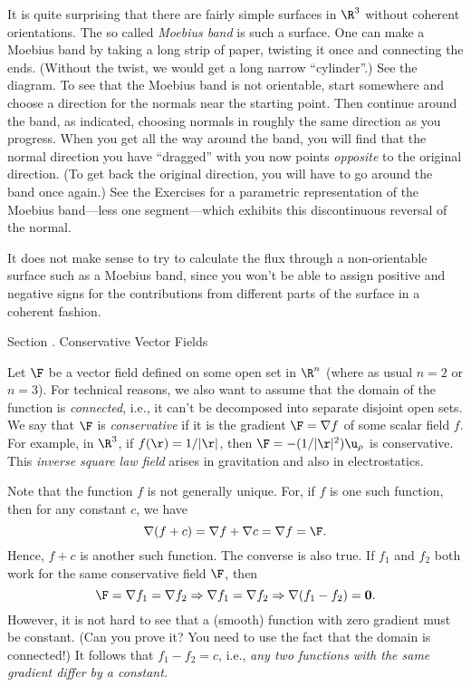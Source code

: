 It is quite surprising that there are fairly simple
surfaces in $\R^3$ without 
coherent orientations.  The so called {\it Moebius
band\/} is such a surface.  One can make a Moebius band
by taking a long strip of paper, twisting it once
and connecting the ends.  (Without the twist, we
would get a long narrow ``cylinder''.)  See the
diagram.  To see that the Moebius band is not
orientable, start somewhere and choose a direction
for the normals near the starting point.  Then continue
around the band, as indicated, choosing
normals in roughly the same direction as you progress.
When you get all the way around the band, 
 you will find that the normal direction
you have ``dragged'' with you now points {\it
opposite\/} to the original direction.  (To
get back the original direction, you will have to
go around the band once again.)  
See the Exercises for a parametric representation of
the Moebius band---less one segment---which exhibits
this discontinuous reversal of the normal.
\medskip
\centerline{}
\medskip
It does not make sense to try to calculate the flux through
a non-orientable surface such as a Moebius band, since
you won't be able to assign positive and negative
signs for the contributions from different parts of the surface
in a coherent fashion.

\bigskip

\bigskip
{}
\head Section \sn.  Conservative Vector Fields \endhead

Let $\F$ be a vector field defined
on some open set in $\R^n$
(where as usual $n = 2$ or $n = 3$).   For technical reasons, we
also want to assume that the domain of the function is {\it
connected\/}, i.e., it can't be decomposed into separate
disjoint open sets.
%
    We say that $\F$ is
 {\it conservative\/} if it is the gradient
$\F = \nabla f$ of some scalar field $f$.
%
   For example,
in $\R^3$,
if $f(\r) = 1/|\r|$, then $\F = -(1/|\r|^2)\u_{\rho}$ is conservative.
This {\it inverse square law field\/} arises in gravitation and also
in electrostatics.

Note that the function $f$ is not generally unique.
For, if $f$ is one such function, then for any constant $c$,
we have
$$
   \nabla(f + c) = \nabla f + \nabla c = \nabla f = \F.
$$
Hence, $f + c$ is another such function.   The converse
is also true.  If  $f_1$ and $f_2$ both work for  
the same conservative field $\F$, then
$$
   \F = \nabla f_1 = \nabla f_2 \Rightarrow \nabla f_1 = \nabla f_2
\Rightarrow \nabla (f_1 - f_2) = \bold 0.
$$
However, it is not hard to see that a (smooth) function with
zero gradient must be constant.  (Can you prove it?  You need to
use the fact that the domain is connected!)  It follows that
$f_1 - f_2 = c$, i.e., {\it any two  functions with the
same 
gradient differ by a constant.}


